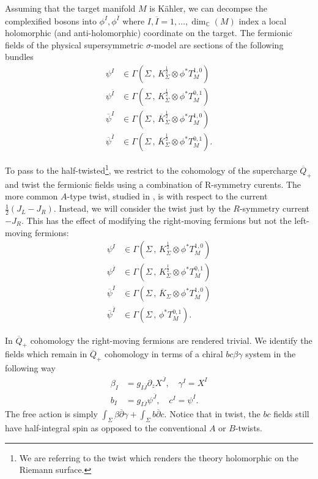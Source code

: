 \documentclass[11pt]{amsart}
\newcommand{\dbar}{\br{\partial}}
\newcommand{\del}{\partial}
\newcommand{\br}{\overline}
\newcommand{\CC}{\mathbb C}
\def\beqn{\begin{equation}}
\def\eeqn{\end{equation}}
\theoremstyle{thm}
\numberwithin{equation}{subsection}
\theoremstyle{def}
\theoremstyle{rem}
\begin{document}
Assuming that the target manifold $M$ is K\"ahler, we can decompse the complexified bosons into $\phi^I, \phi^{\br I}$ where $I, \br I = 1,\ldots, \dim_\CC (M)$ index a local holomorphic (and anti-holomorphic) coordinate on the target.
The fermionic fields of the physical supersymmetric $\sigma$-model are sections of the following bundles
\beqn
\label{eqn:fermionsuntwist}
\begin{split}
\psi^I & \in \Gamma\left(\Sigma \, , \, K^{\frac12}_\Sigma \otimes \phi^* T^{1,0}_M\right) \\ 
\psi^{\br I} & \in \Gamma\left(\Sigma \, , \, K^{\frac12}_\Sigma \otimes \phi^* T^{0,1}_M\right) \\
\br\psi^I & \in \Gamma\left(\Sigma \, , \, \br K^{\frac12}_\Sigma \otimes \phi^* T^{1,0}_M\right) \\
\br\psi^{\br I} & \in \Gamma\left(\Sigma \, , \, \br K^{\frac12}_\Sigma \otimes \phi^* T^{0,1}_M\right). 
\end{split}
\eeqn

To pass to the half-twisted\footnote{We are referring to the twist which renders the theory holomorphic on the Riemann surface.}, we restrict to the cohomology of the supercharge $\br Q_+$ and twist the fermionic fields using a combination of R-symmetry curents. 
The more common $A$-type twist, studied in \cite{KapustinHalf}, is with respect to the current $\frac12 (J_L - J_R)$. 
Instead, we will consider the twist just by the $R$-symmetry current $-J_R$. 
This has the effect of modifying the right-moving fermions but not the left-moving fermions:
\beqn
\label{eqn:fermionstwist}
\begin{split}
\psi^I & \in \Gamma\left(\Sigma \, , \, K^{\frac12}_\Sigma \otimes \phi^* T^{1,0}_M\right) \\ 
\psi^{\br I} & \in \Gamma\left(\Sigma \, , \, K^{\frac12}_\Sigma \otimes \phi^* T^{0,1}_M\right) \\
\br\psi^I & \in \Gamma\left(\Sigma \, , \, \br K_\Sigma \otimes \phi^* T^{1,0}_M\right) \\
\br\psi^{\br I} & \in \Gamma\left(\Sigma \, , \, \phi^* T^{0,1}_M\right). 
\end{split}
\eeqn

In $\br Q_+$ cohomology the right-moving fermions are rendered trivial. 
We identify the fields which remain in $\br Q_+$ cohomology in terms of a chiral $bc \beta\gamma$ system in the following way
\beqn
\begin{split}
\beta_I & = g_{I \br J} \del_z X^{\br J} , \quad \gamma^I = X^I \\
b_I & = g_{I \br J} \psi^{\br J} , \quad c^I = \psi^I .
\end{split}
\eeqn
The free action is simply $\int_\Sigma \beta \dbar \gamma + \int_\Sigma b \dbar c$. 
Notice that in twist, the $bc$ fields still have half-integral spin as opposed to the conventional $A$ or $B$-twists. 
\end{document}
